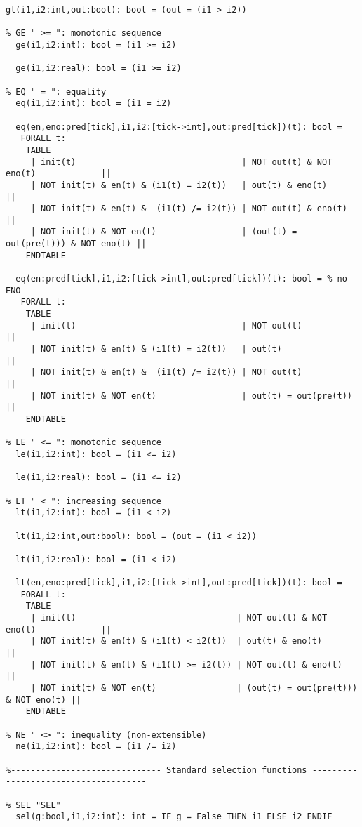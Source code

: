 \begin{singlespace}
\begin{lstlisting}[tabsize=2, language=PVS]
  gt(i1,i2:int,out:bool): bool = (out = (i1 > i2))

% GE " >= ": monotonic sequence
  ge(i1,i2:int): bool = (i1 >= i2)

  ge(i1,i2:real): bool = (i1 >= i2)

% EQ " = ": equality
  eq(i1,i2:int): bool = (i1 = i2)

  eq(en,eno:pred[tick],i1,i2:[tick->int],out:pred[tick])(t): bool = 
   FORALL t:
    TABLE
     | init(t)                                 | NOT out(t) & NOT eno(t)             || 
     | NOT init(t) & en(t) & (i1(t) = i2(t))   | out(t) & eno(t)                     ||
     | NOT init(t) & en(t) &  (i1(t) /= i2(t)) | NOT out(t) & eno(t)                 ||
     | NOT init(t) & NOT en(t)                 | (out(t) = out(pre(t))) & NOT eno(t) ||
    ENDTABLE

  eq(en:pred[tick],i1,i2:[tick->int],out:pred[tick])(t): bool = % no ENO
   FORALL t:
    TABLE
     | init(t)                                 | NOT out(t)           || 
     | NOT init(t) & en(t) & (i1(t) = i2(t))   | out(t)               ||
     | NOT init(t) & en(t) &  (i1(t) /= i2(t)) | NOT out(t)           ||
     | NOT init(t) & NOT en(t)                 | out(t) = out(pre(t)) ||
    ENDTABLE

% LE " <= ": monotonic sequence
  le(i1,i2:int): bool = (i1 <= i2)

  le(i1,i2:real): bool = (i1 <= i2)

% LT " < ": increasing sequence
  lt(i1,i2:int): bool = (i1 < i2)

  lt(i1,i2:int,out:bool): bool = (out = (i1 < i2))

  lt(i1,i2:real): bool = (i1 < i2)

  lt(en,eno:pred[tick],i1,i2:[tick->int],out:pred[tick])(t): bool = 
   FORALL t:
    TABLE
     | init(t)                                | NOT out(t) & NOT eno(t)             || 
     | NOT init(t) & en(t) & (i1(t) < i2(t))  | out(t) & eno(t)                     ||
     | NOT init(t) & en(t) & (i1(t) >= i2(t)) | NOT out(t) & eno(t)                 ||
     | NOT init(t) & NOT en(t)                | (out(t) = out(pre(t))) & NOT eno(t) ||
    ENDTABLE

% NE " <> ": inequality (non-extensible)
  ne(i1,i2:int): bool = (i1 /= i2)

%------------------------------ Standard selection functions -------------------------------------

% SEL "SEL"
  sel(g:bool,i1,i2:int): int = IF g = False THEN i1 ELSE i2 ENDIF


\end{lstlisting}
\end{singlespace}
